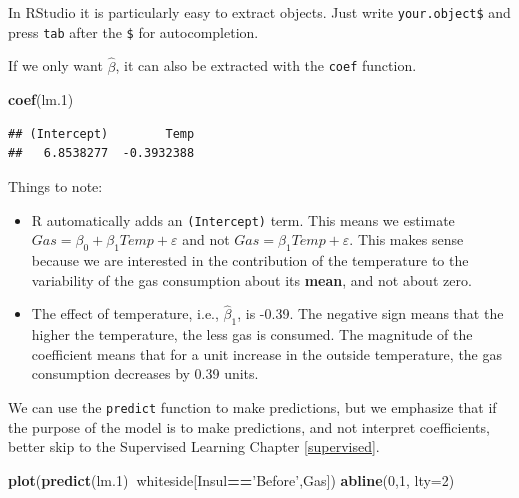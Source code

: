 \documentclass[]{book}
\newenvironment{Shaded}{\begin{snugshade}}{\end{snugshade}}
\newcommand{\KeywordTok}[1]{\textcolor[rgb]{0.13,0.29,0.53}{\textbf{#1}}}
\newcommand{\DataTypeTok}[1]{\textcolor[rgb]{0.13,0.29,0.53}{#1}}
\newcommand{\DecValTok}[1]{\textcolor[rgb]{0.00,0.00,0.81}{#1}}
\newcommand{\StringTok}[1]{\textcolor[rgb]{0.31,0.60,0.02}{#1}}
\newcommand{\OperatorTok}[1]{\textcolor[rgb]{0.81,0.36,0.00}{\textbf{#1}}}
\newcommand{\NormalTok}[1]{#1}
\theoremstyle{definition}
\theoremstyle{definition}
\theoremstyle{definition}
\theoremstyle{remark}
\begin{document}
In RStudio it is particularly easy to extract objects. Just write
\texttt{your.object\$} and press \texttt{tab} after the \texttt{\$} for
autocompletion.

If we only want \(\hat \beta\), it can also be extracted with the
\texttt{coef} function.

\begin{Shaded}
\begin{Highlighting}[]
\KeywordTok{coef}\NormalTok{(lm.}\DecValTok{1}\NormalTok{)}
\end{Highlighting}
\end{Shaded}

\begin{verbatim}
## (Intercept)        Temp 
##   6.8538277  -0.3932388
\end{verbatim}

Things to note:

\begin{itemize}
\item
  R automatically adds an \texttt{(Intercept)} term. This means we
  estimate \(Gas=\beta_0 + \beta_1 Temp + \varepsilon\) and not
  \(Gas=\beta_1 Temp + \varepsilon\). This makes sense because we are
  interested in the contribution of the temperature to the variability
  of the gas consumption about its \textbf{mean}, and not about zero.
\item
  The effect of temperature, i.e., \(\hat \beta_1\), is -0.39. The
  negative sign means that the higher the temperature, the less gas is
  consumed. The magnitude of the coefficient means that for a unit
  increase in the outside temperature, the gas consumption decreases by
  0.39 units.
\end{itemize}

We can use the \texttt{predict} function to make predictions, but we
emphasize that if the purpose of the model is to make predictions, and
not interpret coefficients, better skip to the Supervised Learning
Chapter \ref{supervised}.

\begin{Shaded}
\begin{Highlighting}[]
\KeywordTok{plot}\NormalTok{(}\KeywordTok{predict}\NormalTok{(lm.}\DecValTok{1}\NormalTok{)}\OperatorTok{~}\NormalTok{whiteside[Insul}\OperatorTok{==}\StringTok{'Before'}\NormalTok{,Gas])}
\KeywordTok{abline}\NormalTok{(}\DecValTok{0}\NormalTok{,}\DecValTok{1}\NormalTok{, }\DataTypeTok{lty=}\DecValTok{2}\NormalTok{)}
\end{Highlighting}
\end{Shaded}
\end{document}
